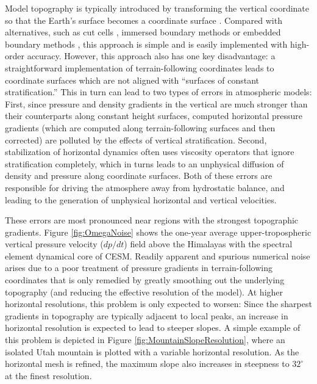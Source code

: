 \documentclass[11pt]{article}
\begin{document}
Model topography is typically introduced by transforming the vertical coordinate so that the Earth's surface becomes a coordinate surface \cite{TGCRCJS1975JCP, schar2002new}.  Compared with alternatives, such as cut cells \cite{causon2000calculation, ingram2003developments}, immersed boundary methods \cite{mittal2005immersed} or embedded boundary methods \cite{johansen1998cartesian, wang2011algorithms}, this approach is simple and is easily implemented with high-order accuracy.  However, this approach also has one key disadvantage:  a straightforward implementation of terrain-following coordinates leads to coordinate surfaces which are not aligned with ``surfaces of constant stratification.''  This in turn can lead to two types of errors in atmospheric models:  First, since pressure and density gradients in the vertical are much stronger than their counterparts along constant height surfaces, computed horizontal pressure gradients (which are computed along terrain-following surfaces and then corrected) are polluted by the effects of vertical stratification.  Second, stabilization of horizontal dynamics often uses viscosity operators \cite{dennis2011cam} that ignore stratification completely, which in turns leads to an unphysical diffusion of density and pressure along coordinate surfaces.  Both of these errors are responsible for driving the atmosphere away from hydrostatic balance, and leading to the generation of unphysical horizontal and vertical velocities.

These errors are most pronounced near regions with the strongest topographic gradients.  Figure \ref{fig:OmegaNoise} shows the one-year average upper-tropospheric vertical pressure velocity ($dp/dt$) field above the Himalayas with the spectral element dynamical core of CESM.  Readily apparent and spurious numerical noise arises due to a poor treatment of pressure gradients in terrain-following coordinates that is only remedied by greatly smoothing out the underlying topography (and reducing the effective resolution of the model).  At higher horizontal resolutions, this problem is only expected to worsen:  Since the sharpest gradients in topography are typically adjacent to local peaks, an increase in horizontal resolution is expected to lead to steeper slopes.  A simple example of this problem is depicted in Figure \ref{fig:MountainSlopeResolution}, where an isolated Utah mountain is plotted with a variable horizontal resolution.  As the horizontal mesh is refined, the maximum slope also increases in steepness to $32^\circ$ at the finest resolution.
\end{document}
